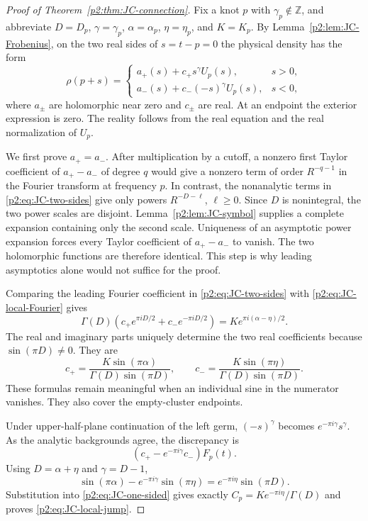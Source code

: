 \documentclass[11pt,a4paper]{article}
\theoremstyle{definition}
\theoremstyle{remark}
\numberwithin{equation}{section}
\begin{document}
\begin{proof}[Proof of Theorem~\ref{p2:thm:JC-connection}]
Fix a knot $p$ with $\gamma_p\notin\mathbb Z$, and abbreviate
$D=D_p$, $\gamma=\gamma_p$, $\alpha=\alpha_p$,
$\eta=\eta_p$, and $K=K_p$.  By
Lemma~\ref{p2:lem:JC-Frobenius}, on the two real sides of $s=t-p=0$
the physical density has the form
\begin{equation}\label{p2:eq:JC-two-sides}
 \rho(p+s)=
 \begin{cases}
  a_+(s)+c_+s^\gamma U_p(s),&s>0,\\
  a_-(s)+c_-(-s)^\gamma U_p(s),&s<0,
 \end{cases}
\end{equation}
where $a_\pm$ are holomorphic near zero and $c_\pm$ are real.
At an endpoint the exterior expression is zero.  The reality follows
from the real equation and the real normalization of $U_p$.

We first prove $a_+=a_-$.  After multiplication by a cutoff, a
nonzero first Taylor coefficient of $a_+-a_-$ of degree $q$ would
give a nonzero term of order $R^{-q-1}$ in the Fourier transform
at frequency $p$.  In contrast, the nonanalytic terms in
\eqref{p2:eq:JC-two-sides} give only powers $R^{-D-\ell}$,
$\ell\ge0$.  Since $D$ is nonintegral, the two power scales are
disjoint.  Lemma~\ref{p2:lem:JC-symbol} supplies a complete expansion
containing only the second scale.  Uniqueness of an asymptotic power
expansion forces every Taylor coefficient of $a_+-a_-$ to vanish.
The two holomorphic functions are therefore identical.  This step
is why leading asymptotics alone would not suffice for the proof.

Comparing the leading Fourier coefficient in
\eqref{p2:eq:JC-two-sides} with \eqref{p2:eq:JC-local-Fourier} gives
\[
 \Gamma(D)\left(c_+e^{\pi iD/2}+c_-e^{-\pi iD/2}\right)
       =K e^{\pi i(\alpha-\eta)/2}.
\]
The real and imaginary parts uniquely determine the two real
coefficients because $\sin(\pi D)\ne0$.  They are
\begin{equation}\label{p2:eq:JC-one-sided}
 c_+=\frac{K\sin(\pi\alpha)}{\Gamma(D)\sin(\pi D)},
 \qquad
 c_-=\frac{K\sin(\pi\eta)}{\Gamma(D)\sin(\pi D)}.
\end{equation}
These formulas remain meaningful when an individual sine in the
numerator vanishes.  They also cover the empty-cluster endpoints.

Under upper-half-plane continuation of the left germ,
$(-s)^\gamma$ becomes $e^{-\pi i\gamma}s^\gamma$.
As the analytic backgrounds agree, the discrepancy is
\[
 (c_+-e^{-\pi i\gamma}c_-)F_p(t).
\]
Using $D=\alpha+\eta$ and $\gamma=D-1$,
\[
 \sin(\pi\alpha)-e^{-\pi i\gamma}\sin(\pi\eta)
    =e^{-\pi i\eta}\sin(\pi D).
\]
Substitution into \eqref{p2:eq:JC-one-sided} gives exactly
$C_p=K e^{-\pi i\eta}/\Gamma(D)$ and proves
\eqref{p2:eq:JC-local-jump}.


\end{proof}
\end{document}
